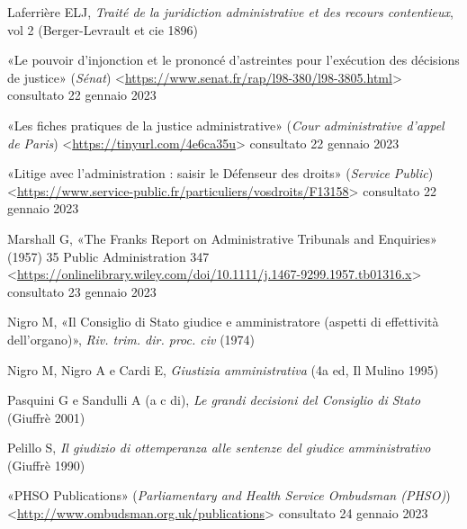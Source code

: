 \documentclass[12pt,it,a4paper,]{report}
\newlength{\cslhangindent}
\newenvironment{CSLReferences}[2] %
 {%
  \setlength{\parindent}{0pt}
  \ifodd #1 \everypar{\setlength{\hangindent}{\cslhangindent}}\ignorespaces\fi
  \ifnum #2 > 0
  \setlength{\parskip}{#2\baselineskip}
  \fi
 }%
 {}
\begin{document}
\begin{CSLReferences}{0}{0}
\leavevmode{}%
Laferrière ELJ, \emph{Traité de la juridiction administrative et des
recours contentieux}, vol 2 (Berger-Levrault et cie 1896)

\leavevmode{}%
{«Le pouvoir d'injonction et le prononcé d'astreintes pour l'exécution
des décisions de justice»} (\emph{Sénat})
\textless{}\url{https://www.senat.fr/rap/l98-380/l98-3805.html}\textgreater{}
consultato 22 gennaio 2023

\leavevmode{}%
{«Les fiches pratiques de la justice administrative»} (\emph{Cour
administrative d'appel de Paris})
\textless{}\url{https://tinyurl.com/4e6ca35u}\textgreater{} consultato
22 gennaio 2023

\leavevmode{}%
{«Litige avec l'administration : saisir le Défenseur des droits»}
(\emph{Service Public})
\textless{}\url{https://www.service-public.fr/particuliers/vosdroits/F13158}\textgreater{}
consultato 22 gennaio 2023

\leavevmode{}%
Marshall G, {«The Franks Report on Administrative Tribunals and
Enquiries»} (1957) 35 Public Administration 347
\textless{}\url{https://onlinelibrary.wiley.com/doi/10.1111/j.1467-9299.1957.tb01316.x}\textgreater{}
consultato 23 gennaio 2023

\leavevmode{}%
Nigro M, {«Il Consiglio di Stato giudice e amministratore (aspetti di
effettività dell'organo)»}, \emph{Riv. trim. dir. proc. civ} (1974)

\leavevmode{}%
Nigro M, Nigro A e Cardi E, \emph{Giustizia amministrativa} (4a ed, Il
Mulino 1995)

\leavevmode{}%
Pasquini G e Sandulli A (a c di), \emph{Le grandi decisioni del
Consiglio di Stato} (Giuffrè 2001)

\leavevmode{}%
Pelillo S, \emph{Il giudizio di ottemperanza alle sentenze del giudice
amministrativo} (Giuffrè 1990)

\leavevmode{}%
{«PHSO Publications»} (\emph{Parliamentary and Health Service Ombudsman
(PHSO)})
\textless{}\url{http://www.ombudsman.org.uk/publications}\textgreater{}
consultato 24 gennaio 2023


\end{CSLReferences}
\end{document}
